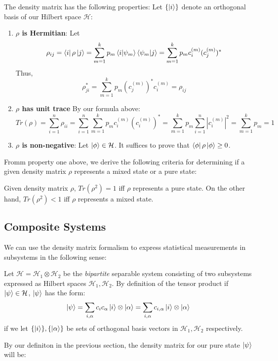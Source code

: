\documentclass{../quantum.tex}
\begin{document}
The density matrix has the following properties: Let $\{\ket{i}\}$ denote an orthogonal basis of our Hilbert space $\mathcal{H}$:

\begin{enumerate}
  \item {\bf $\rho$ is Hermitian}: Let
  $$ \rho_{ij} = \bra{i}\rho\ket{j} = \sum_{m=1}^k p_m \bra{i}\ket{\psi_m} \bra{\psi_m}\ket{j} = \sum_{m=1}^k p_m c_i^{(m)} (c_j^{(m)})^*$$ Thus,
  $$ \rho_{ji}^* = \sum_{m=1}^k p_m (c_j^{(m)})^* c_i^{(m)} = \rho_{ij}  $$
  \item {\bf $\rho$ has unit trace} By our formula above:
  $$ Tr(\rho) = \sum_{i=1}^n \rho_{ii} = \sum_{i=1}^n\sum_{m=1}^k p_m c_{i}^{(m)}(c_{i}^{(m)})^* = \sum_{m=1}^k p_m \sum_{i=1}^n|c_i^{(m)}|^2 =
  \sum_{m=1}^k p_m = 1
  $$
  \item {\bf $\rho$ is non-negative}: Let $\ket{\phi} \in \mathcal{H}$. It suffices to prove that $\bra{\phi}\rho\ket{\phi} \geq 0$.
\end{enumerate}

Fromm property one above, we derive the following criteria for determining if a given density matrix $\rho$ represents a mixed state or a pure state:

\begin{theorem}
  Given density matrix $\rho$, $Tr(\rho^2) = 1$ iff $\rho$ represents a pure state. On the other hand, $Tr(\rho^2) < 1$ iff $\rho$ represents a mixed state.
\end{theorem}

\subsection{Composite Systems}

We can use the density matrix formalism to express statistical measurements in subsystems in the following sense:

Let $\mathcal{H} = \mathcal{H}_1 \otimes \mathcal{H}_2$ be the \textit{bipartite} separable system consisting of two subsystems expressed as Hilbert spaces $\mathcal{H}_1,\mathcal{H}_2$. By definition of the tensor product if $\ket{\psi} \in \mathcal{H}$, $\ket{\psi}$ has the form:
$$ \ket{\psi} = \sum_{i,\alpha} c_{i}c_{\alpha} \ket{i}\otimes\ket{\alpha} =  \sum_{i,\alpha} c_{i,\alpha} \ket{i}\otimes\ket{\alpha}$$
if we let $\{\ket{i}\},\{\ket{\alpha}\}$ be sets of orthogonal basis vectors in $\mathcal{H}_1,\mathcal{H}_2$ respectively.

By our definiton in the previous section, the density matrix for our pure state $\ket{\psi}$ will be:
\end{document}
